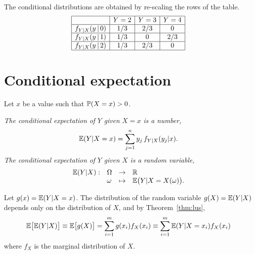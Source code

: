 \begin{solution}
 The conditional distributions are obtained by re-scaling the rows of the table.
\[\begin{array}{|c|c|c|c|}\hline
					& Y=2	& Y=3	& Y=4	\\ \hline 
f_{Y|X}(y\,|\,0)	& 1/3	& 2/3	& 0		\\ \hline
f_{Y|X}(y\,|\,1)	& 1/3	& 0		& 2/3	\\ \hline
f_{Y|X}(y\,|\,2)	& 1/3	& 2/3	& 0		\\ \hline
\end{array}\]
\end{solution}

\section{Conditional expectation}
Let $x$ be a value such that $\mathbb{P}(X=x)>0$. 
\begin{definition}
\ben
\it The \emph{conditional expectation of $Y$ given $X=x$} is a number,
\[
\mathbb{E}(Y|X=x) 
	= \sum_{j=1}^n y_j\,f_{Y|X}(y_j|x).
\]
\it The \emph{conditional expectation of $Y$ given $X$} is a random variable,
\[\begin{array}{llll}
\mathbb{E}(Y|X):	& \Omega 	& \to 		& \mathbb{R} \\
			& \omega		& \mapsto 	& \mathbb{E}\big(Y|X=X(\omega)\big).
\end{array}\]
\een
\end{definition}

\begin{remark}
Let $g(x) = \mathbb{E}(Y|X=x)$. The distribution of the random variable $g(X)=\mathbb{E}(Y|X)$ depends only on the distribution of $X$, and by Theorem~\ref{thm:lus}, 
\[
\mathbb{E}\big[\mathbb{E}(Y|X)\big] \equiv \mathbb{E}\big[g(X)\big] = \sum_{i=1}^m g(x_i) f_X(x_i) \equiv \sum_{i=1}^m \mathbb{E}(Y|X=x_i) f_X(x_i)
\]
where $f_X$ is the marginal distribution of $X$.
\end{remark}

